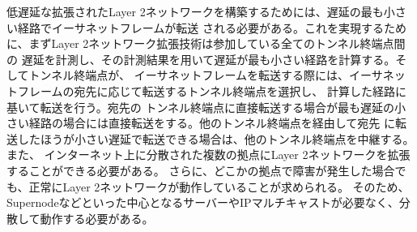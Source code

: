 低遅延な拡張されたLayer 2ネットワークを構築するためには、遅延の最も小さい経路でイーサネットフレームが転送
される必要がある。これを実現するために、まずLayer 2ネットワーク拡張技術は参加している全てのトンネル終端点間の
遅延を計測し、その計測結果を用いて遅延が最も小さい経路を計算する。そしてトンネル終端点が、
イーサネットフレームを転送する際には、イーサネットフレームの宛先に応じて転送するトンネル終端点を選択し、
計算した経路に基いて転送を行う。宛先の
トンネル終端点に直接転送する場合が最も遅延の小さい経路の場合には直接転送をする。他のトンネル終端点を経由して宛先
に転送したほうが小さい遅延で転送できる場合は、他のトンネル終端点を中継する。また、
インターネット上に分散された複数の拠点にLayer 2ネットワークを拡張することができる必要がある。
さらに、どこかの拠点で障害が発生した場合でも、正常にLayer 2ネットワークが動作していることが求められる。
そのため、Supernodeなどといった中心となるサーバーやIPマルチキャストが必要なく、分散して動作する必要がある。

